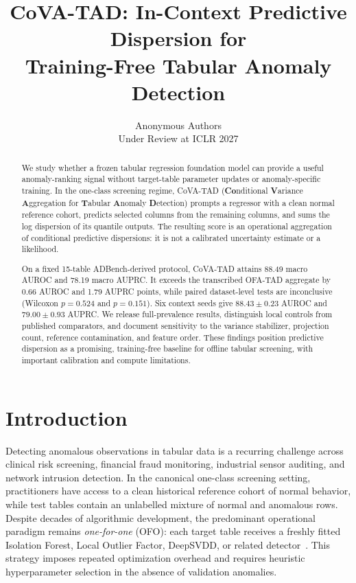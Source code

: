 \documentclass{article}
\title{CoVA-TAD: In-Context Predictive Dispersion for\\Training-Free Tabular Anomaly Detection}
\author{Anonymous Authors \\ Under Review at ICLR 2027}
\begin{document}
\maketitle

\begin{abstract}
We study whether a frozen tabular regression foundation model can provide a useful anomaly-ranking signal without target-table parameter updates or anomaly-specific training. In the one-class screening regime, CoVA-TAD (\textbf{Co}nditional \textbf{V}ariance \textbf{A}ggregation for \textbf{T}abular \textbf{A}nomaly \textbf{D}etection) prompts a regressor with a clean normal reference cohort, predicts selected columns from the remaining columns, and sums the log dispersion of its quantile outputs. The resulting score is an operational aggregation of conditional predictive dispersions: it is not a calibrated uncertainty estimate or a likelihood.

On a fixed 15-table ADBench-derived protocol, CoVA-TAD attains 88.49 macro AUROC and 78.19 macro AUPRC. It exceeds the transcribed OFA-TAD aggregate by 0.66 AUROC and 1.79 AUPRC points, while paired dataset-level tests are inconclusive (Wilcoxon $p=0.524$ and $p=0.151$). Six context seeds give $88.43\pm0.23$ AUROC and $79.00\pm0.93$ AUPRC. We release full-prevalence results, distinguish local controls from published comparators, and document sensitivity to the variance stabilizer, projection count, reference contamination, and feature order. These findings position predictive dispersion as a promising, training-free baseline for offline tabular screening, with important calibration and compute limitations.
\end{abstract}

\section{Introduction}
\label{sec:intro}

Detecting anomalous observations in tabular data is a recurring challenge across clinical risk screening, financial fraud monitoring, industrial sensor auditing, and network intrusion detection. In the canonical one-class screening setting, practitioners have access to a clean historical reference cohort of normal behavior, while test tables contain an unlabelled mixture of normal and anomalous rows. Despite decades of algorithmic development, the predominant operational paradigm remains \emph{one-for-one} (OFO): each target table receives a freshly fitted Isolation Forest, Local Outlier Factor, DeepSVDD, or related detector~\citep{liu2008isolation,breunig2000lof,ruff2018deep}. This strategy imposes repeated optimization overhead and requires heuristic hyperparameter selection in the absence of validation anomalies.
\end{document}

